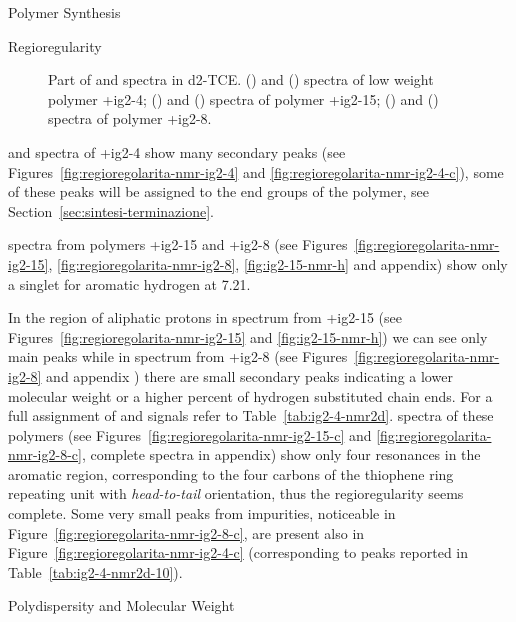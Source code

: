 \begin{section}{Polymer Synthesis}
\begin{subsection}{Regioregularity}
\begin{figure}[tbp]
\caption[Part of {\HNMR} and {\CNMR} spectra in d2-TCE.]{Part of {\HNMR} and {\CNMR} spectra in d2-\gls{TCE}. 
() and () spectra of low weight polymer \cmpd+{ig2-4}; () and () spectra of polymer \cmpd+{ig2-15}; () and () spectra of polymer \cmpd+{ig2-8}.}\label{fig:regioregolarita-nmr}
\end{figure}

{\HNMR} and {\CNMR} spectra of \cmpd+{ig2-4} show many secondary peaks (see Figures~\ref{fig:regioregolarita-nmr-ig2-4} and \ref{fig:regioregolarita-nmr-ig2-4-c}), some of these peaks will be assigned to the end groups of the polymer, see Section~\ref{sec:sintesi-terminazione}. 

{\HNMR} spectra from polymers \cmpd+{ig2-15} and \cmpd+{ig2-8} (see Figures~\ref{fig:regioregolarita-nmr-ig2-15}, \ref{fig:regioregolarita-nmr-ig2-8}, \ref{fig:ig2-15-nmr-h} and appendix) show only a singlet for aromatic hydrogen at \SI{7.21}{\ppm}.

In the region of aliphatic protons in {\HNMR} spectrum from \cmpd+{ig2-15} (see Figures~\ref{fig:regioregolarita-nmr-ig2-15} and \ref{fig:ig2-15-nmr-h}) we can see only main peaks while in {\HNMR} spectrum from \cmpd+{ig2-8} (see Figures~\ref{fig:regioregolarita-nmr-ig2-8} and appendix%
) there are small secondary peaks indicating a lower molecular weight or a higher percent of hydrogen substituted chain ends. For a full assignment of {\HNMR} and {\CNMR} signals refer to Table~\ref{tab:ig2-4-nmr2d}.
{\CNMR} spectra of these polymers (see Figures~\ref{fig:regioregolarita-nmr-ig2-15-c} and \ref{fig:regioregolarita-nmr-ig2-8-c}, complete spectra in appendix) show only four resonances in the aromatic region, corresponding to the four carbons of the thio\-phene ring repeating unit with \textit{head-to-tail} orientation, thus the regioregularity seems complete. 
Some very small peaks from impurities, noticeable in Figure~\ref{fig:regioregolarita-nmr-ig2-8-c}, are present also in Figure~\ref{fig:regioregolarita-nmr-ig2-4-c} (corresponding to peaks reported in Table~\ref{tab:ig2-4-nmr2d-10}).
\end{subsection}
\begin{subsection}{Polydispersity and Molecular Weight}
\label{sec:weight}


\end{subsection}
\end{section}
